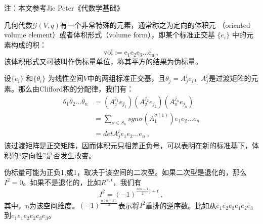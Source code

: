 
注：本文参考Jie Peter《代数学基础》

几何代数$\mathcal G(V,q)$有一个非常特殊的元素，通常称之为定向的体积元
（oriented volume element）或者体积形式（volume form），即某个标准正交基 $\{e_i\}$ 中的元素构成的积：
$$\mathrm {vol:=e_1e_2e_3...e_n}~,$$
该体积形式又可被叫作伪标量单位，称其平方的结果为伪标量。

设$\{e_i\}$ 和$\{\theta_i\}$ 为线性空间$V$中的两组标准正交基，且$\theta_j=A^i_j e_i$，$A^i_j$是过渡矩阵的元素。那么由Clifford积的分配律，我们有：
\begin{equation}
\begin{aligned}
\theta_1\theta_2...\theta_n&=(A^{j_1}_1 e_{j_1})(A^{j_2}_2 e_{j_2})(A^{j_n}_n e_{j_n})\\
&=\sum_{\sigma\in S_n} sgn\sigma(A^{\sigma (1)}_1)e_1e_2...e_n\\
&=det A^i_je_1e_2...e_n~,
\end{aligned}
\end{equation}
该过渡矩阵是正交矩阵，因而体积元只相差正负号，可以表明在新的标准基下，体积的“定向性”是否发生改变。

伪标量可能为正负1,或1，取决于该空间的二次型。如果二次型是退化的，那么$I^2=0$。如果不是退化的，比如$R^{s,t}$，我们有
\begin{equation}
I^2=(-1)^{\frac{n(n-1}{2})+t}~,
\end{equation}
其中，n为该空间维度。$(-1)^{\frac{n(n-1)}{2}}$表示将$I^2$重排的逆序数。比如从$e_1e_2e_3e_1e_2e_3$到$e_1e_1e_2e_2e_3e_3$。


